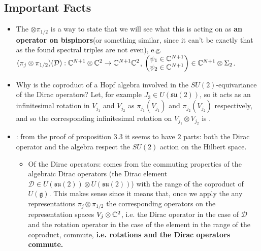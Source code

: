 \documentclass{article}
\newcommand{\alg}[1]{\ensuremath{\mathfrak{#1}}}
\newcommand{\sut}{\ensuremath{\mathfrak{su}(2)}}
\begin{document}
\subsection{Important Facts}

    \begin{itemize}

    \item The $\otimes \pi_{1/2}$ is a way to state that we will see what this is acting on as \textbf{an operator on bispinors}(or something similar, since it can't be exactly that as the found spectral triples are not even), e.g. $(\pi_j \otimes \pi_{1/2})(\mathcal D): \mathbb{C}^{N+1}\otimes \mathbb{C}^2 \to \mathbb{C}^{N+1}\mathbb{C}^2$, $\begin{pmatrix} \psi_1 \in \mathbb{C}^{N+1} \\ \psi_2 \in \mathbb{C}^{N+1} \end{pmatrix} \in \mathbb{C}^{N+1}\otimes \Sigma_2$.
    
    \item Why is the coproduct of a Hopf algebra involved in the $SU(2)$-equivariance of the Dirac operators? Let, for example $J_3 \in U(\sut)$, so it acts as an infinitesimal rotation in $V_{j_1}$ and $V_{j_2}$ as $\pi_{j_1}(V_{j_1})$ and $\pi_{j_2}(V_{j_2})$ respectively, and so the corresponding infinitesimal rotation on $V_{j_1}\otimes V_{j_2}$ is .
    
    \item {}: from the proof of proposition 3.3 it seems to have $2$ parts: both the Dirac operator and the algebra respect the $SU(2)$ action on the Hilbert space.
    
        \begin{itemize}
            
        \item Of the Dirac operators: comes from the commuting properties of the algebraic Dirac operators (the Dirac element $\mathcal D \in U(\sut) \otimes U(\sut)$) with the range of the coproduct of $U(\alg g)$. This makes sense since it means that, once we apply the any representations $\pi_j \otimes \pi_{1/2}$ the corresponding operators on the representation spaces $V_j \otimes \mathbb{C}^2$, i.e. the Dirac operator in the case of $\mathcal D$ and the rotation operator in the case of the element in the range of the coproduct, commute, \textbf{i.e. rotations and the Dirac operators commute.}
            

\end{itemize}
\end{itemize}
\end{document}
